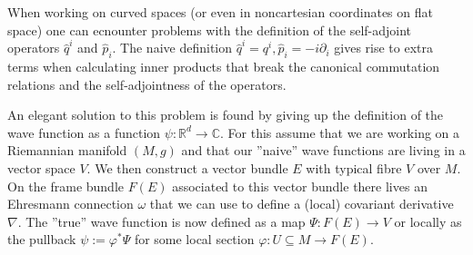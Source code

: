 	\begin{construct}
		When working on curved spaces (or even in noncartesian coordinates on flat space) one can ecnounter problems with the definition of the self-adjoint operators $\hat{q}^i$ and $\hat{p}_i$. The naive definition $\hat{q}^i = q^i, \hat{p}_i = -i\partial_i$ gives rise to extra terms when calculating inner products that break the canonical commutation relations and the self-adjointness of the operators.
	
		An elegant solution to this problem is found by giving up the definition of the wave function as a function $\psi:\mathbb{R}^d\rightarrow\mathbb{C}$. For this assume that we are working on a Riemannian manifold $(M, g)$ and that our ''naive'' wave functions are living in a vector space $V$. We then construct a vector bundle $E$ with typical fibre $V$ over $M$. On the frame bundle $F(E)$ associated to this vector bundle there lives an Ehresmann connection $\omega$ that we can use to define a (local) covariant derivative $\nabla$. The ''true'' wave function is now defined as a map $\Psi: F(E)\rightarrow V$ or locally as the pullback $\psi := \varphi^*\Psi$ for some local section $\varphi:U\subseteq M\rightarrow F(E)$.
		

\end{construct}
